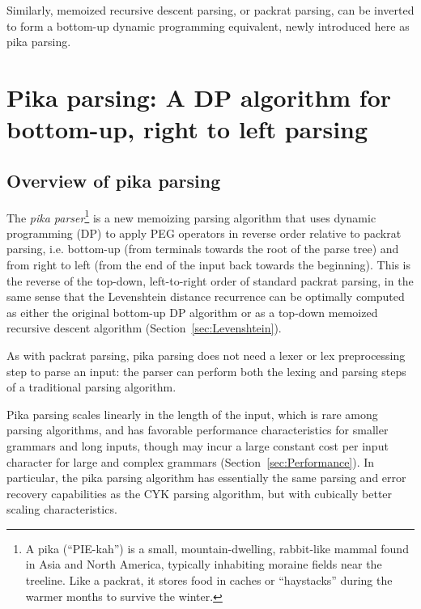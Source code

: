 \documentclass[manuscript,screen]{acmart}
\begin{document}
Similarly, memoized recursive descent parsing, or packrat parsing, can be inverted to form a bottom-up dynamic programming equivalent, newly introduced here as pika parsing.

\section{\label{sec:thePikaParser}Pika parsing: A DP algorithm for bottom-up, right to left parsing}

\subsection{Overview of pika parsing}

The \emph{pika parser}\footnote{A pika (``PIE-kah'') is a small, mountain-dwelling, rabbit-like mammal found in Asia and North America, typically inhabiting moraine fields near the treeline. Like a packrat, it stores food in caches or ``haystacks'' during the warmer months to survive the winter.} is a new memoizing parsing algorithm that uses dynamic programming (DP) to apply PEG operators in reverse order relative to packrat parsing, i.e. bottom-up (from terminals towards the root of the parse tree) and from right to left (from the end of the input back towards the beginning). This is the reverse of the top-down, left-to-right order of standard packrat parsing, in the same sense that the Levenshtein distance recurrence can be optimally computed as either the original bottom-up DP algorithm or as a top-down memoized recursive descent algorithm (Section~\ref{sec:Levenshtein}).

As with packrat parsing, pika parsing does not need a lexer or lex preprocessing step to parse an input: the parser can perform both the lexing and parsing steps of a traditional parsing algorithm.

Pika parsing scales linearly in the length of the input, which is rare among parsing algorithms, and has favorable performance characteristics for smaller grammars and long inputs, though may incur a large constant cost per input character for large and complex grammars (Section~\ref{sec:Performance}). In particular, the pika parsing algorithm has essentially the same parsing and error recovery capabilities as the CYK parsing algorithm, but with cubically better scaling characteristics.
\end{document}
